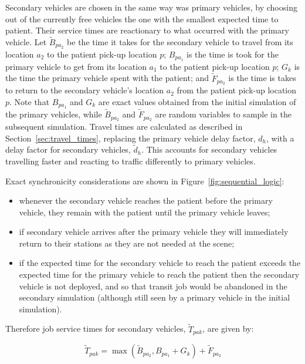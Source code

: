 \documentclass[preprint,12pt]{elsarticle}
\begin{document}
Secondary vehicles are chosen in the same way was primary vehicles, by choosing
out of the currently free vehicles the one with the smallest expected time to
patient. Their service times are reactionary to what occurred with the primary
vehicle.
Let $\tilde{B}_{pa_2}$ be the time it takes for the secondary vehicle to travel
from its location $a_2$ to the patient pick-up location $p$; $B_{pa_1}$ is the
time is took for the primary vehicle to get from its location $a_1$ to the
patient pick-up location $p$; $G_k$ is the time the primary vehicle spent
with the patient; and $\tilde{F}_{pa_2}$ is the time is takes to return to the
secondary vehicle's location $a_2$ from the patient pick-up location $p$.
Note that $B_{pa_1}$ and $G_k$ are exact values obtained from the
initial simulation of the primary vehicles, while $\tilde{B}_{pa_2}$ and
$\tilde{F}_{pa_2}$ are random variables to sample in the subsequent simulation.
Travel times are calculated as described in Section~\ref{sec:travel_times},
replacing the primary vehicle delay factor, $d_h$, with a delay factor for
secondary vehicles, $\tilde{d}_h$. This accounts for secondary vehicles
travelling faster and reacting to traffic differently to primary vehicles.

Exact synchronicity considerations are shown in Figure~\ref{fig:sequential_logic}:
\begin{itemize}
  \item whenever the secondary vehicle reaches the patient before the primary
  vehicle, they remain with the patient until the primary vehicle leaves;
  \item if secondary vehicle arrives after the primary vehicle they will
  immediately return to their stations as they are not needed at the scene;
  \item if the expected time for the secondary vehicle to reach the patient
  exceeds the expected time for the primary vehicle to reach the patient then
  the secondary vehicle is not deployed, and so that transit job would be
  abandoned in the secondary simulation (although still seen by a primary
  vehicle in the initial simulation).
\end{itemize}

Therefore job service times for secondary vehicles, $\tilde{T}_{pak}$, are
given by:

\begin{equation}
  \tilde{T}_{pak} = \max\left(\tilde{B}_{pa_2}, B_{pa_1} + G_k \right) + \tilde{F}_{pa_2}
\end{equation}
\end{document}
